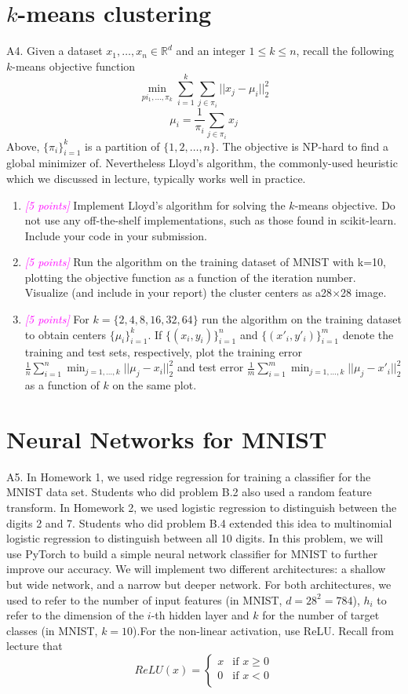 \documentclass{article}
\newcommand{\field}[1]{\mathbb{#1}}
\newcommand{\1}{\mathbf{1}}
\newcommand{\R}{\field{R}} %
\newcommand{\points}[1]{\small\textcolor{magenta}{\emph{[#1 points]}} \normalsize}
\begin{document}
\newpage
\section*{$k$-means clustering}
A4. Given a dataset $x_1,\hdots, x_n \in\R^d$ and an integer $1\leq k \leq n$, recall the following $k$-means objective function 
$$\min_{pi_1,\hdots,\pi_k} \sum_{i=1}^k\sum_{j\in\pi_i} ||x_j-\mu_i||^2_2$$
$$\mu_i=\frac{1}{\pi_i} \sum_{j\in\pi_i} x_j$$
Above, $\{\pi_i\}^k_{i=1}$ is a partition of $\{1,2,\hdots,n\}$. The objective is NP-hard to find a global minimizer of. Nevertheless Lloyd’s algorithm, the commonly-used heuristic which we discussed in lecture, typically works well in practice.
\begin{enumerate}
    \item \points{5} Implement Lloyd’s algorithm for solving the $k$-means objective. Do not use any off-the-shelf implementations, such as those found in scikit-learn.  Include your code in your submission.
    \item \points{5} Run the algorithm on the training dataset of MNIST with k=10, plotting the objective function as a function of the iteration number. Visualize (and include in your report) the cluster centers as a28$\times$28 image.
    \item \points{5} For $k=\{2,4,8,16,32,64\}$ run the algorithm on the training dataset to obtain centers $\{\mu_i\}^k_{i=1}$. If $\{(x_i,y_i)\}^n_{i=1}$ and $\{(x'_i,y'_i)\}^m_{i=1}$ denote the training and test sets, respectively, plot the training error $\frac{1}{n}\sum^n_{i=1}\min_{j=1,\hdots,k} ||\mu_j - x_i ||^2_2$ and test error $\frac{1}{m}\sum^m_{i=1} \min_{j=1,\hdots,k} ||\mu_j - x'_i||^2_2$ as a function of $k$ on the same plot.
\end{enumerate}


\newpage
\section*{Neural Networks for MNIST}
A5. In Homework 1, we used ridge regression for training a classifier for the MNIST data set. Students who did problem B.2 also used a random feature transform. In Homework 2, we used logistic regression to distinguish between the digits 2 and 7. Students who did problem B.4 extended this idea to multinomial logistic regression to distinguish between all 10 digits. In this problem, we will use PyTorch to build a simple neural network classifier for MNIST to further improve our accuracy. We will implement two different architectures: a shallow but wide network, and a narrow but deeper network. For both architectures, we used to refer to the number of input features (in MNIST, $d=28^2=784$), $h_i$ to refer to the dimension of the $i$-th hidden layer and $k$ for the number of target classes (in MNIST, $k=10$).For the non-linear activation, use ReLU. Recall from lecture that
$$ReLU(x) = \begin{cases} 
    x &\mbox{if } x \geq 0\\
    0 &\mbox{if } x < 0 \\
\end{cases} $$
\end{document}
